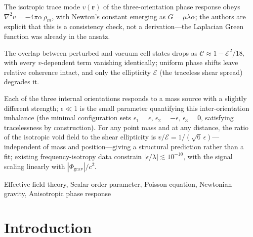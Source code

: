 \documentclass[a4paper,fleqn]{cas-dc}
\theoremstyle{thmstyleone}%
\theoremstyle{thmstyletwo}%
\begin{document}
\begin{highlights}
\item  The isotropic trace mode $v(\mathbf{r})$ of the three-orientation phase
    response obeys $\nabla^{2}v = -4\pi\alpha\,\rho_{m}$, with Newton's
    constant emerging as $G = \mu\lambda\alpha$; the authors are explicit
    that this is a consistency check, not a derivation---the Laplacian Green
    function was already in the ansatz.
\item The overlap between perturbed and vacuum cell states drops as
    $\mathcal{C} \approx 1 - \mathcal{E}^{2}/18$, with every
    $v$-dependent term vanishing identically; uniform phase shifts leave
    relative coherence intact, and only the ellipticity $\mathcal{E}$
    (the traceless shear spread) degrades it.
 
\item Each of the three internal orientations responds to a mass source with a
    slightly different strength; $\epsilon\ll 1$ is the small parameter
    quantifying this inter-orientation imbalance (the minimal configuration
    sets $\epsilon_{1}=\epsilon$, $\epsilon_{2}=-\epsilon$,
    $\epsilon_{3}=0$, satisfying tracelessness by construction).
    For any point mass and at any distance, the ratio of the isotropic void
    field to the shear ellipticity is
    $v/\mathcal{E} = 1/(\sqrt{6}\,\epsilon)$---independent of mass and
    position---giving a structural prediction rather than a fit; existing
    frequency-isotropy data constrain $|\epsilon/\lambda|\lesssim 10^{-10}$,
    with the signal scaling linearly with $|\Phi_{\mathrm{grav}}|/c^{2}$.
\end{highlights}



\begin{keywords}
Effective field theory, Scalar order parameter, Poisson equation, Newtonian gravity, Anisotropic phase response
\end{keywords}

\maketitle


\section{Introduction}
\label{sec:introduction}
\end{document}
